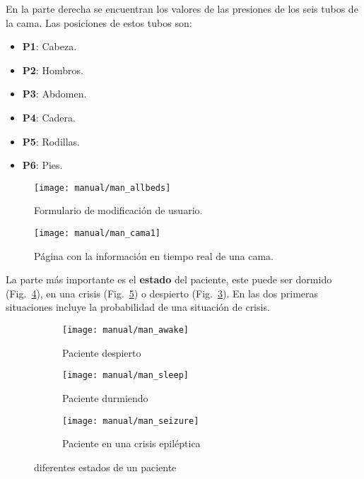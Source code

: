 En la parte derecha se encuentran los valores de las presiones de los seis tubos de la cama. Las posiciones de estos tubos son:
\begin{itemize}
	\item \textbf{P1}: Cabeza.
	\item \textbf{P2}: Hombros.
	\item \textbf{P3}: Abdomen.
	\item \textbf{P4}: Cadera.
	\item \textbf{P5}: Rodillas.
	\item \textbf{P6}: Pies.
\end{itemize}

\begin{figure}
	\centering
	\texttt{[image: manual/man\_allbeds]}
	\caption{Formulario de modificación de usuario.}
	\label{fig:man_bedlist}
\end{figure}

\begin{figure}
	\centering
	\texttt{[image: manual/man\_cama1]}
	\caption{Página con la información en tiempo real de una cama.}
	\label{fig:man_bed}
\end{figure}

La parte más importante es el \textbf{estado} del paciente, este puede ser dormido (Fig.~\ref{fig:man_dormido}), en una crisis (Fig.~\ref{fig:man_crisis}) o despierto (Fig.~\ref{fig:man_despiertos}). En las dos primeras situaciones incluye la probabilidad de una situación de crisis.

\begin{figure}
	\centering
	\begin{subfigure}[b]{0.48\textwidth}
		\centering
		\texttt{[image: manual/man\_awake]}
		\caption{Paciente despierto}
		\label{fig:man_despiertos}
	\end{subfigure}
	\begin{subfigure}[b]{1\textwidth}
		\centering
		\texttt{[image: manual/man\_sleep]}
		\caption{Paciente durmiendo}
		\label{fig:man_dormido}
	\end{subfigure}
	\begin{subfigure}[b]{0.9\textwidth}
		\centering
		\texttt{[image: manual/man\_seizure]}
		\caption{Paciente en una crisis epiléptica}
		\label{fig:man_crisis}
	\end{subfigure}
	\caption{diferentes estados de un paciente}
	\label{fig:man_states}
\end{figure}

